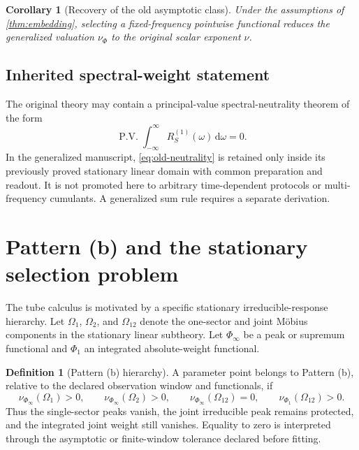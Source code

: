 \documentclass[11pt]{article}
\newtheorem{corollary}[theorem]{Corollary}
\theoremstyle{definition}
\newtheorem{definition}[theorem]{Definition}
\theoremstyle{remark}
\newcommand{\dd}{\,\mathrm d}
\newcommand{\PhiF}{\Phi}
\newcommand{\OmegaI}{\Omega}
\newcommand{\PV}{\operatorname{P.V.}}
\begin{document}
\begin{corollary}[Recovery of the old asymptotic class]\label{cor:old-nu}
Under the assumptions of \cref{thm:embedding}, selecting a fixed-frequency pointwise functional reduces the generalized valuation $\nu_{\PhiF}$ to the original scalar exponent $\nu$.
\end{corollary}

\subsection{Inherited spectral-weight statement}

The original theory may contain a principal-value spectral-neutrality theorem of the form
\begin{equation}
\PV\int_{-\infty}^{\infty}R_S^{(1)}(\omega)\dd\omega=0.
\label{eq:old-neutrality}
\end{equation}
In the generalized manuscript, \eqref{eq:old-neutrality} is retained only inside its previously proved stationary linear domain with common preparation and readout. It is not promoted here to arbitrary time-dependent protocols or multi-frequency cumulants. A generalized sum rule requires a separate derivation.

\section{Pattern (b) and the stationary selection problem}

The tube calculus is motivated by a specific stationary irreducible-response hierarchy. Let $\OmegaI_1$, $\OmegaI_2$, and $\OmegaI_{12}$ denote the one-sector and joint M\"obius components in the stationary linear subtheory. Let $\PhiF_\infty$ be a peak or supremum functional and $\PhiF_1$ an integrated absolute-weight functional.

\begin{definition}[Pattern (b) hierarchy]\label{def:pattern-b}
A parameter point belongs to Pattern (b), relative to the declared observation window and functionals, if
\begin{equation}
\nu_{\PhiF_\infty}(\OmegaI_1)>0,
\qquad
\nu_{\PhiF_\infty}(\OmegaI_2)>0,
\qquad
\nu_{\PhiF_\infty}(\OmegaI_{12})=0,
\qquad
\nu_{\PhiF_1}(\OmegaI_{12})>0.
\label{eq:pattern-b}
\end{equation}
Thus the single-sector peaks vanish, the joint irreducible peak remains protected, and the integrated joint weight still vanishes. Equality to zero is interpreted through the asymptotic or finite-window tolerance declared before fitting.
\end{definition}
\end{document}
